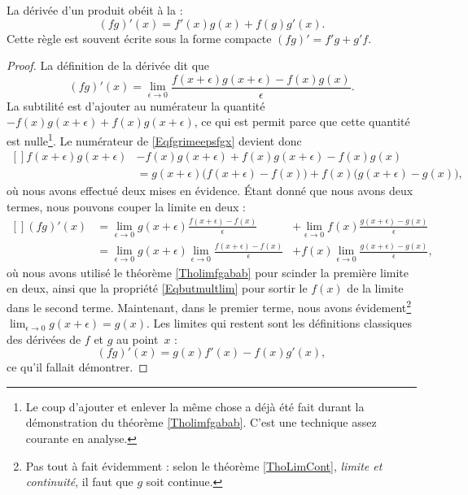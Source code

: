 \begin{proposition}
    La dérivée d'un produit obéit à la :
    \begin{equation}
        (fg)'(x)=f'(x)g(x)+f(g)g'(x).
    \end{equation}
    Cette règle est souvent écrite sous la forme compacte $(fg)'=f'g+g'f$.
\end{proposition}

\begin{proof}
La définition de la dérivée dit que
\begin{equation}        \label{Eqfgrimeepsfgx}
    (fg)'(x)=\lim_{\epsilon\to 0}\frac{f(x+\epsilon)g(x+\epsilon)-f(x)g(x)}{\epsilon}.
\end{equation}
La subtilité est d'ajouter au numérateur la quantité $-f(x)g(x+\epsilon)+f(x)g(x+\epsilon)$, ce qui est permit parce que cette quantité est nulle\footnote{Le coup d'ajouter et enlever la même chose a déjà été fait durant la démonstration du théorème \ref{Tholimfgabab}. C'est une technique assez courante en analyse.}. Le numérateur de \eqref{Eqfgrimeepsfgx} devient donc
\begin{equation}
    \begin{aligned}[]
f(x+\epsilon)g(x+\epsilon)&-f(x)g(x+\epsilon)+f(x)g(x+\epsilon)-f(x)g(x) \\
            &= g(x+\epsilon)\big( f(x+\epsilon)-f(x) \big)+f(x)\big( g(x+\epsilon)-g(x) \big),
    \end{aligned}
\end{equation}
où nous avons effectué deux mises en évidence. Étant donné que nous avons deux termes, nous pouvons couper la limite en deux :
\begin{equation}
    \begin{aligned}[]
        (fg)'(x)    &=\lim_{\epsilon\to 0}g(x+\epsilon)\frac{ f(x+\epsilon)-f(x) }{\epsilon}            &+\lim_{\epsilon\to 0}f(x)\frac{ g(x+\epsilon)-g(x) }{\epsilon}\\
                &=\lim_{\epsilon\to 0}g(x+\epsilon)\lim_{\epsilon\to 0}\frac{ f(x+\epsilon)-f(x) }{\epsilon}    &+f(x)\lim_{\epsilon\to 0}\frac{ g(x+\epsilon)-g(x) }{\epsilon},
    \end{aligned}
\end{equation}
où nous avons utilisé le théorème \ref{Tholimfgabab} pour scinder la première limite en deux, ainsi que la propriété \eqref{Eqbutmultlim} pour sortir le $f(x)$ de la limite dans le second terme. Maintenant, dans le premier terme, nous avons évidement\footnote{Pas tout à fait évidemment : selon le théorème \ref{ThoLimCont}, \emph{limite et continuité}, il faut que $g$ soit continue.} $\lim_{\epsilon\to 0}g(x+\epsilon)=g(x)$. Les limites qui restent sont les définitions classiques des dérivées de $f$ et $g$ au point~$x$ :
\begin{equation}
    (fg)'(x)=g(x)f'(x)-f(x)g'(x),
\end{equation}
ce qu'il fallait démontrer.
\end{proof}

